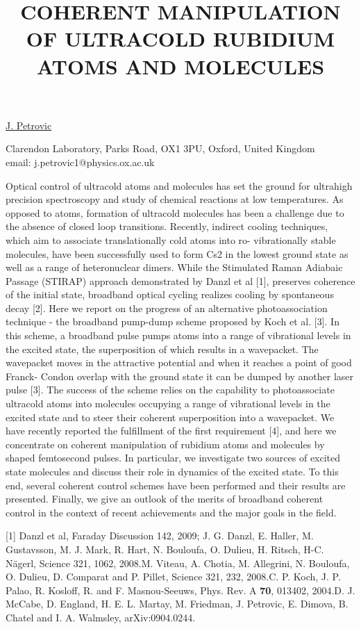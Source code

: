 \title{COHERENT MANIPULATION OF ULTRACOLD RUBIDIUM ATOMS AND MOLECULES}

\underline{J. Petrovic}


Clarendon Laboratory, Parks Road, OX1 3PU, Oxford, United Kingdom\\
email: j.petrovic1@physics.ox.ac.uk

Optical control of ultracold atoms and molecules has set the ground for ultrahigh precision spectroscopy and study of chemical
reactions at low temperatures. As opposed to atoms, formation of ultracold molecules has been a challenge  due to the absence
of closed loop transitions. Recently, indirect cooling techniques, which aim to associate translationally cold atoms into ro-
vibrationally stable molecules, have been successfully used to form Cs2 in the lowest ground state as well as a range of
heteronuclear dimers. While the Stimulated Raman Adiabaic Passage (STIRAP) approach demonstrated by Danzl et al [1],
preserves coherence of the initial state, broadband optical cycling realizes cooling by spontaneous decay [2]. Here we report on
the progress of an alternative photoassociation technique - the broadband pump-dump scheme proposed by Koch et al. [3].
In this scheme, a broadband pulse pumps atoms into a range of vibrational levels in the excited state, the superposition of
which results in a wavepacket. The wavepacket moves in the attractive potential and when it reaches a point of good Franck-
Condon overlap with the ground state it can be dumped by another laser pulse [3]. The success of the scheme relies on the
capability to photoassociate ultracold atoms into molecules occupying a range of vibrational levels in the excited state and to
steer their coherent superposition into a wavepacket. We have recently reported the fulfillment of the first requirement [4], and
here we concentrate on coherent manipulation of rubidium atoms and molecules by shaped femtosecond pulses. In particular, we
investigate two sources of excited state molecules and discuss their role in dynamics of the excited state. To this end, several
coherent control schemes have been performed and their results are presented. Finally, we give an outlook of the merits of
broadband coherent control in the context of recent achievements and the major goals in the field.

[1] Danzl et al, Faraday Discussion 142, 2009; J. G. Danzl, E. Haller, M. Gustavsson, M. J. Mark, R. Hart, N. Bouloufa, O. Dulieu, H.
Ritsch, H-C. N\"{a}gerl, Science 321, 1062, 2008.\newline
[2] M. Viteau, A. Chotia, M. Allegrini, N. Bouloufa, O. Dulieu, D. Comparat and P. Pillet, Science 321, 232, 2008.\newline
[3] C. P. Koch, J. P. Palao, R. Kosloff, R. and F. Masnou-Seeuws, Phys. Rev. A \textbf{70}, 013402, 2004.\newline
[4] D. J. McCabe, D. England, H. E. L. Martay, M. Friedman, J. Petrovic, E. Dimova, B. Chatel and I. A. Walmsley, arXiv:0904.0244.

\vspace{\baselineskip}